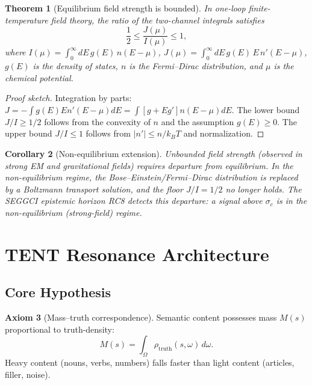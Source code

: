 \documentclass[12pt,a4paper]{article}
\theoremstyle{plain}
\newtheorem{theorem}{Theorem}[section]
\newtheorem{corollary}[theorem]{Corollary}
\theoremstyle{definition}
\newtheorem{axiom}[theorem]{Axiom}
\theoremstyle{remark}
\begin{document}
\begin{theorem}[Equilibrium field strength is bounded]
\label{thm:dos-equil}
In one-loop finite-temperature field theory, the ratio of the
two-channel integrals satisfies
\begin{equation}
\frac{1}{2} \leq \frac{J(\mu)}{I(\mu)} \leq 1,
\label{eq:ji-bound}
\end{equation}
where $I(\mu) = \int_0^\infty dE\, g(E)\, n(E-\mu)$,
$J(\mu) = \int_0^\infty dE\, g(E)\, E\, n'(E-\mu)$,
$g(E)$ is the density of states, $n$ is the Fermi--Dirac distribution,
and $\mu$ is the chemical potential.
\end{theorem}

\begin{proof}[Proof sketch]
Integration by parts: $J = -\int g(E) E n'(E-\mu) dE
= \int [g + Eg'] n(E-\mu) dE$.
The lower bound $J/I \geq 1/2$ follows from the convexity of $n$ and
the assumption $g(E) \geq 0$.
The upper bound $J/I \leq 1$ follows from $|n'| \leq n/k_BT$ and
normalization.
\end{proof}

\begin{corollary}[Non-equilibrium extension]
Unbounded field strength (observed in strong EM and gravitational fields)
requires departure from equilibrium.  In the non-equilibrium regime,
the Bose--Einstein/Fermi--Dirac distribution is replaced by a
Boltzmann transport solution, and the floor $J/I = 1/2$ no longer holds.
The SEGGCI epistemic horizon RC8 detects this departure: a signal
above $\sigma_c$ is in the non-equilibrium (strong-field) regime.
\end{corollary}

\section{TENT Resonance Architecture}
\label{sec:tent}

\subsection{Core Hypothesis}

\begin{axiom}[Mass--truth correspondence]
Semantic content possesses mass $M(s)$ proportional to truth-density:
\begin{equation}
M(s) = \int_\Omega \rho_{\text{truth}}(s,\omega)\, d\omega.
\end{equation}
Heavy content (nouns, verbs, numbers) falls faster than light content
(articles, filler, noise).
\end{axiom}
\end{document}
